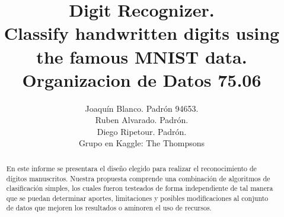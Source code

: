 \documentclass[a4paper,11pt]{report}
\title{Digit Recognizer. \\ 
  Classify handwritten digits using the famous MNIST data.\\
  Organizacion de Datos 75.06}
\author{Joaquín Blanco. Padrón 94653.\\
  Ruben Alvarado. Padrón.\\
  Diego Ripetour. Padrón.\\
  Grupo en Kaggle: The Thompsons}
\begin{document}
\maketitle
\tableofcontents

\begin{abstract}
En este informe se presentara el diseño elegido para realizar el reconocimiento de dígitos manuscritos. Nuestra propuesta comprende una combinación de algoritmos de clasificación simples, los cuales fueron testeados de forma independiente de tal manera que se puedan determinar aportes, limitaciones y posibles modificaciones al conjunto de datos que mejoren los resultados o aminoren el uso de recursos.
\end{abstract}

\end{document}
